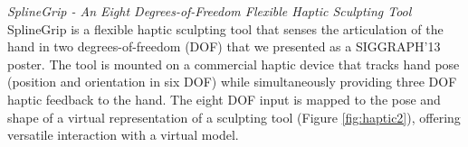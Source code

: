 \begin{enumerate}
{\textit{SplineGrip - An Eight Degrees-of-Freedom Flexible Haptic Sculpting Tool} SplineGrip is a flexible haptic sculpting tool that senses the articulation of the hand in two degrees-of-freedom (DOF) that we presented as a SIGGRAPH'13 poster. The tool is mounted on a commercial haptic device that tracks hand pose (position and orientation in six DOF) while simultaneously providing three DOF haptic feedback to the hand. The eight DOF input is mapped to the pose and shape of a virtual representation of a sculpting tool (Figure \ref{fig:haptic2}), offering versatile interaction with a virtual model.

\begin{figure}[!h]
\centering
{}

\end{figure}}
\end{enumerate}
